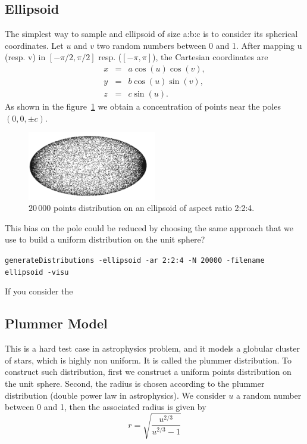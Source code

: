 \documentclass[10pt]{article}
\begin{document}
\subsection{Ellipsoid}
\label{nonuniEllipsoid}
The simplest way to sample and ellipsoid of size a:b:c is to consider its spherical coordinates. Let $u$ and $v$ two random numbers between 0 and 1. After mapping u (resp. v) in $[-\pi/2,\pi/2]$ resp. ($[-\pi,\pi]$), the Cartesian coordinates are    
\begin{eqnarray*}
x	&=&	a\cos(u)\cos(v),\\
y	&=&	b\cos(u)\sin(v), \\
z  &=&	c\sin(u).
\end{eqnarray*}
As shown in the figure~\ref{Fig-nonUnifEllipsoid} we obtain a concentration of points near the poles $(0,0,\pm c)$.
\begin{figure}[hbt]
  \centering
   \includegraphics[width=0.5\textwidth]{ellipsoid}
    \caption{$20\,000$ points distribution on an ellipsoid of aspect ratio 2:2:4.}%
    \label{Fig-nonUnifEllipsoid}
\end{figure}
This bias on the pole could be reduced by choosing the same approach that we use to build a uniform distribution on the unit sphere?


\texttt{generateDistributions -ellipsoid -ar 2:2:4   -N 20000 -filename ellipsoid -visu}

If you consider the 

\subsection{Plummer Model}
This is a hard test case in astrophysics problem, and it models a globular cluster of stars, which is highly non uniform.  It is called   the plummer distribution. To construct such distribution, first we construct a uniform points distribution on the unit sphere. Second, the radius is chosen according to the plummer distribution (double power law in astrophysics). We consider $u$ a random number between 0 and 1, then the associated radius is given by
\begin{equation*}
r = \sqrt{\frac{u^{2/3}}{u^{2/3}-1}}
\end{equation*}
\end{document}
